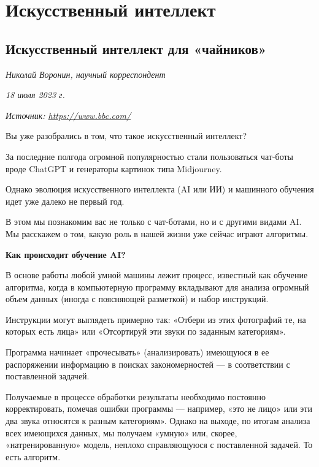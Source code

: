 \chapter{Искусственный интеллект}

\section{Искусственный интеллект для «чайников»}

\textit{Николай Воронин, научный корреспондент}

\textit{18 июля 2023 г.}

\textit{Источник: \url{https://www.bbc.com/}}




Вы уже разобрались в том, что такое искусственный интеллект?

За последние полгода огромной популярностью стали пользоваться чат-боты вроде ChatGPT и генераторы картинок типа Midjourney.

Однако эволюция искусственного интеллекта (AI или ИИ) и машинного обучения идет уже далеко не первый год.

В этом  мы познакомим вас не только с чат-ботами, но и с другими видами AI. Мы расскажем о том, какую роль в нашей жизни уже сейчас играют алгоритмы.

\textbf{Как происходит обучение AI?}

В основе работы любой умной машины лежит процесс, известный как обучение алгоритма, когда в компьютерную программу вкладывают для анализа огромный объем данных (иногда с поясняющей разметкой) и набор инструкций.

Инструкции могут выглядеть примерно так: «Отбери из этих фотографий те, на которых есть лица» или «Отсортируй эти звуки по заданным категориям».

Программа начинает «прочесывать» (анализировать) имеющуюся в ее распоряжении информацию в поисках закономерностей — в соответствии с поставленной задачей.

Получаемые в процессе обработки результаты необходимо постоянно корректировать, помечая ошибки программы --- например, «это не лицо» или эти два звука относятся к разным категориям». Однако на выходе, по итогам анализа всех имеющихся данных, мы получаем «умную» или, скорее, «натренированную» модель, неплохо справляющуюся с поставленной задачей. То есть алгоритм.

